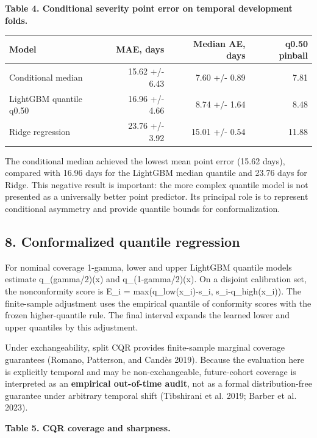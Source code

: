 \documentclass[
]{article}
\begin{document}
\textbf{Table 4. Conditional severity point error on temporal
development folds.}

\begin{longtable}[]{@{}lrrr@{}}
\toprule\noalign{}
Model & MAE, days & Median AE, days & q0.50 pinball \\
\midrule\noalign{}
\endhead
\bottomrule\noalign{}
\endlastfoot
Conditional median & 15.62 +/- 6.43 & 7.60 +/- 0.89 & 7.81 \\
LightGBM quantile q0.50 & 16.96 +/- 4.66 & 8.74 +/- 1.64 & 8.48 \\
Ridge regression & 23.76 +/- 3.92 & 15.01 +/- 0.54 & 11.88 \\
\end{longtable}

The conditional median achieved the lowest mean point error (15.62
days), compared with 16.96 days for the LightGBM median quantile and
23.76 days for Ridge. This negative result is important: the more
complex quantile model is not presented as a universally better point
predictor. Its principal role is to represent conditional asymmetry and
provide quantile bounds for conformalization.

\subsection{8. Conformalized quantile
regression}\label{conformalized-quantile-regression}

For nominal coverage 1-gamma, lower and upper LightGBM quantile models
estimate q\_(gamma/2)(x) and q\_(1-gamma/2)(x). On a disjoint
calibration set, the nonconformity score is E\_i =
max(q\_low(x\_i)-s\_i, s\_i-q\_high(x\_i)). The finite-sample adjustment
uses the empirical quantile of conformity scores with the frozen
higher-quantile rule. The final interval expands the learned lower and
upper quantiles by this adjustment.

Under exchangeability, split CQR provides finite-sample marginal
coverage guarantees (Romano, Patterson, and Candès 2019). Because the
evaluation here is explicitly temporal and may be non-exchangeable,
future-cohort coverage is interpreted as an \textbf{empirical
out-of-time audit}, not as a formal distribution-free guarantee under
arbitrary temporal shift (Tibshirani et al. 2019; Barber et al. 2023).

\textbf{Table 5. CQR coverage and sharpness.}
\end{document}
